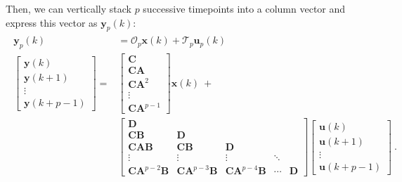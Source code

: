 \documentclass[letterpaper,10pt,english]{sphinxmanual}
\begin{document}
\sphinxAtStartPar
Then, we can vertically stack \(p\) successive time\sphinxhyphen{}points into a
column vector and express this vector as \(\mathbf{y}_{p}(k)\):
\begin{equation*}
\begin{split}\begin{aligned}
\mathbf{y}_{p}(k) &= \mathcal{O}_{p}\mathbf{x}(k) + \mathcal{T}_{p}\mathbf{u}_{p}(k) \\
\begin{bmatrix}
\mathbf{y}(k) \\
\mathbf{y}(k+1) \\
\vdots \\
\mathbf{y}(k+p-1)
\end{bmatrix}
=&
\begin{bmatrix}
\mathbf{C} \\
\mathbf{CA} \\
\mathbf{CA}^{2} \\
\vdots \\
\mathbf{CA}^{p-1}
\end{bmatrix}
\mathbf{x}(k)
~+ \\
&
\begin{bmatrix}
\mathbf{D} \\
\mathbf{CB} & \mathbf{D} \\
\mathbf{CAB} & \mathbf{CB} & \mathbf{D} \\
\vdots & \vdots & \vdots & \ddots \\
\mathbf{CA}^{p-2}\mathbf{B} & \mathbf{CA}^{p-3}\mathbf{B} & \mathbf{CA}^{p-4}\mathbf{B} & \cdots & \mathbf{D}
\end{bmatrix}
\begin{bmatrix}
\mathbf{u}(k) \\
\mathbf{u}(k+1) \\
\vdots \\
\mathbf{u}(k+p-1)
\end{bmatrix}~.
\end{aligned}\end{split}
\end{equation*}
\end{document}
